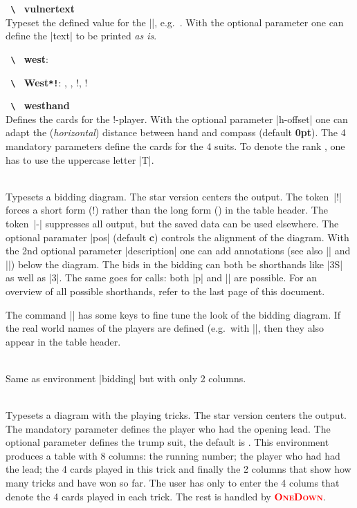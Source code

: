\documentclass[a4paper,fontsize=11pt,%
  danish,%
  dutch,%
  french,%
  german,%
  norsk,%
  spanish,%
  swedish,%
  turkish,%
  english,%
]{scrartcl}
\newcommand\OneDown{\textcolor{red}{\smaller\bfseries\textsc{OneDown}}\xspace}
\newcommand\bs{%
  \texttt{%
    \upshape%
    \textbackslash%
  }%
}%
\let\olditem\item
\renewcommand\item[1][\relax]{\olditem\textbf{\bs#1}}
\newcommand\Oarg[1]{\colorbox{optbackgr}{\texttt{#1}}}
\begin{document}
\begin{description}[itemsep=-0.3em]
\item[vulnertext\Q{[text]}]\\
Typeset the defined value for the |\vulner|, e.g.\
\mbox{\vulnertext[\NorthSouth*]}.  With the optional parameter one can
define the |text| to be printed \emph{as is}.

\item[west]: \west 
\item[West\Oarg{*!}]: \West, \West*, \West!, \West*! 

\item[westhand]\\
Defines the cards for the
\West*!-player. With the optional parameter |h-offset| one can adapt the
(\emph{horizontal}) distance between hand and compass (default
\textbf{0pt}). The 4 mandatory parameters define the cards for the 4 suits.
To denote the rank \suit{T}, one has to use the uppercase letter |T|.

\olditem[\string\begin\string{bidding\string}\Oarg{*!-}\Q{[pos](description)}\ldots\string\end\string{bidding\string}]~\\
Typesets a bidding diagram. The star version centers the output. The
token~|!| forces a short form (\North*!) rather than the long form
(\North*) in the table header. The token~|-| suppresses all output, but the
saved data can be used elsewhere. The optional paramater |pos| (default
\textbf{c}) controls the alignment of the diagram. With the 2nd optional
parameter |description| one can add annotations (see also |\markit| and
|\explainit|) below the diagram. The bids in the bidding can both be
shorthands like |3S| as well as |3\Sp|. The same goes for calls: both |p|
and |\pass| are possible. For an overview of all possible shorthands, refer
to the last page of this document.
\par
The command |\setdefaults| has some keys to fine tune the
look of the bidding diagram. If the real world names of the players are
defined (e.g.\ with |\namesNS|, then they also appear in the table header.

\olditem[\string\begin\string{biddingpair\string}\Oarg{*!-}\Q{[pos](description)}\ldots\string\end\string{biddingpair\string}]~\\
Same as environment |bidding| but with only 2 columns.

\olditem[\string\begin\string{play\string}\Oarg{*}\Q{{lead}[trump]}\ldots\string\end\string{play\string}]~\\
Typesets a diagram with the playing tricks. The star version centers the
output. The mandatory parameter defines the player who had the opening
lead. The optional parameter defines the trump suit, the default is \NT.
This environment produces a table with 8 columns: the running number; the
player who had had the lead; the 4 cards played in this trick and finally
the 2 columns that show how many tricks \northsouth{} and \eastwest{} have
won so far. The user has only to enter the 4 colums that denote the 4 cards
played in each trick. The rest is handled by \OneDown.
%
\end{description}
\end{document}
